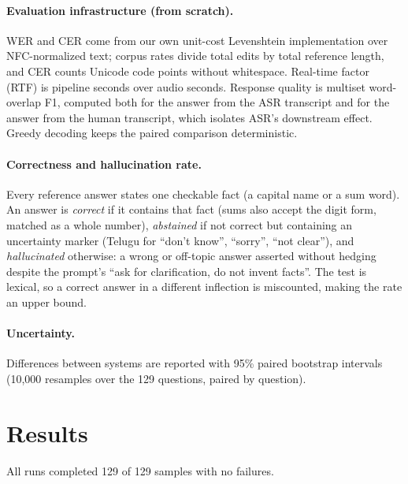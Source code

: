 \documentclass[11pt,a4paper,twocolumn]{article}
\begin{document}
\paragraph{Evaluation infrastructure (from scratch).} WER and CER come from our own unit-cost Levenshtein implementation over NFC-normalized text; corpus rates divide total edits by total reference length, and CER counts Unicode code points without whitespace. Real-time factor (RTF) is pipeline seconds over audio seconds. Response quality is multiset word-overlap F1, computed both for the answer from the ASR transcript and for the answer from the human transcript, which isolates ASR's downstream effect. Greedy decoding keeps the paired comparison deterministic.

\paragraph{Correctness and hallucination rate.} Every reference answer states one checkable fact (a capital name or a sum word). An answer is \emph{correct} if it contains that fact (sums also accept the digit form, matched as a whole number), \emph{abstained} if not correct but containing an uncertainty marker (Telugu for ``don't know'', ``sorry'', ``not clear''), and \emph{hallucinated} otherwise: a wrong or off-topic answer asserted without hedging despite the prompt's ``ask for clarification, do not invent facts''. The test is lexical, so a correct answer in a different inflection is miscounted, making the rate an upper bound.

\paragraph{Uncertainty.} Differences between systems are reported with 95\% paired bootstrap intervals (10{,}000 resamples over the 129 questions, paired by question).

\section{Results}
\label{sec:results}

All runs completed 129 of 129 samples with no failures.
\end{document}
